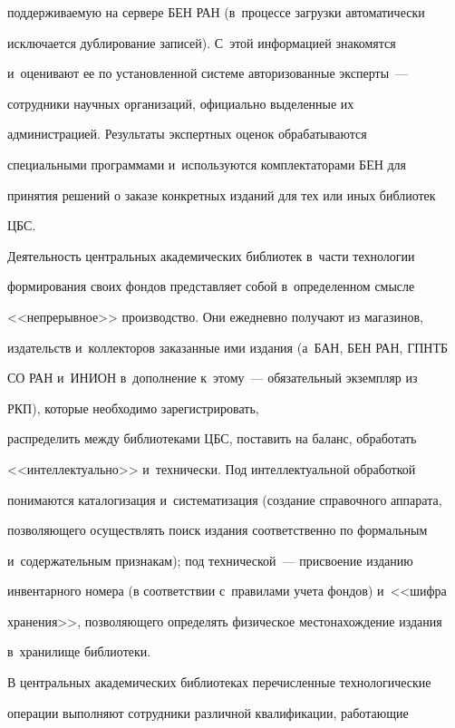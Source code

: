 поддерживаемую на сервере БЕН РАН (в~процессе загрузки автоматически 


исключается дублирование записей). С~этой информацией знакомятся 


и~оценивают ее по установленной системе авторизованные эксперты~--- 


сотрудники научных организаций, официально выделенные их 


администрацией. Результаты экспертных оценок обрабатываются 


специальными программами и~используются комплектаторами БЕН для 


принятия решений о заказе конкретных изданий для тех или иных библиотек 


ЦБС. 


  


  Деятельность центральных академических библиотек в~части технологии 


формирования своих фондов представляет собой в~определенном смысле 


<<непрерывное>> производство. Они ежедневно получают из магазинов, 


издательств и~коллекторов заказанные ими издания (а~БАН, БЕН РАН, ГПНТБ 


СО РАН и~ИНИОН в~дополнение к~этому~--- обязательный экземпляр из 


РКП), которые необходимо зарегистрировать, 


распределить между библиотеками ЦБС, поставить на баланс, обработать 


<<интеллектуально>> и~технически. Под интеллектуальной обработкой 


понимаются каталогизация и~систематизация (создание справочного аппарата, 


позволяющего осуществлять поиск издания соответственно по формальным 


и~содержательным признакам); под технической~--- присвоение изданию 


инвентарного номера (в соответствии с~правилами учета фондов) и~<<шиф\-ра 


хранения>>, позволяющего определять физическое местонахождение издания 


в~хранилище библиотеки. 


  


  В центральных академических библиотеках перечисленные технологические 


операции выполняют сотрудники различной квалификации, работающие 


